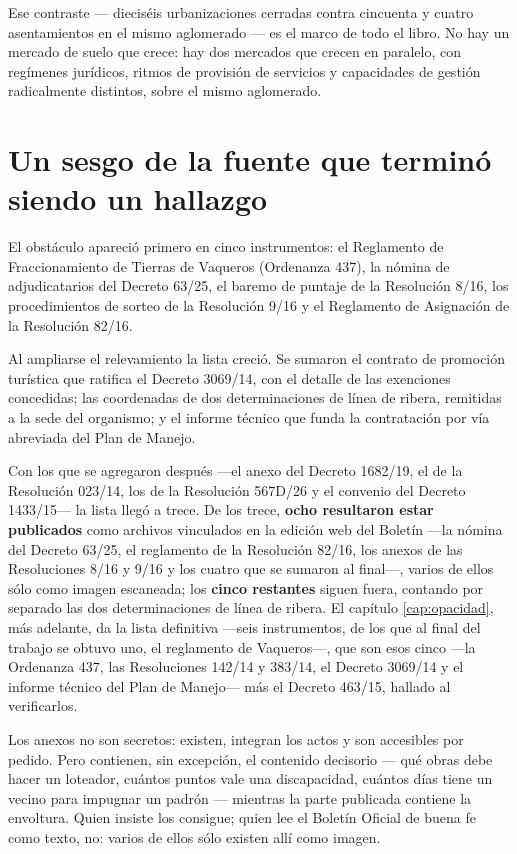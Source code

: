 \begin{cautela}
Ese contraste --- dieciséis urbanizaciones cerradas contra cincuenta y cuatro asentamientos en el mismo aglomerado --- es el marco de todo el libro. No hay un mercado de suelo que crece: hay dos mercados que crecen en paralelo, con regímenes jurídicos, ritmos de provisión de servicios y capacidades de gestión radicalmente distintos, sobre el mismo aglomerado.
\end{cautela}

\section{Un sesgo de la fuente que terminó siendo un hallazgo}

El obstáculo apareció primero en cinco instrumentos: el Reglamento de Fraccionamiento de Tierras de Vaqueros (Ordenanza 437), la nómina de adjudicatarios del Decreto 63/25, el baremo de puntaje de la Resolución 8/16, los procedimientos de sorteo de la Resolución 9/16 y el Reglamento de Asignación de la Resolución 82/16.

Al ampliarse el relevamiento la lista creció. Se sumaron el contrato de promoción turística que ratifica el Decreto 3069/14, con el detalle de las exenciones concedidas; las coordenadas de dos determinaciones de línea de ribera, remitidas a la sede del organismo; y el informe técnico que funda la contratación por vía abreviada del Plan de Manejo.

Con los que se agregaron después ---el anexo del Decreto 1682/19, el de la Resolución 023/14, los de la Resolución 567D/26 y el convenio del Decreto 1433/15--- la lista llegó a trece. De los trece, \textbf{ocho resultaron estar publicados} como archivos vinculados en la edición web del Boletín ---la nómina del Decreto 63/25, el reglamento de la Resolución 82/16, los anexos de las Resoluciones 8/16 y 9/16 y los cuatro que se sumaron al final---, varios de ellos sólo como imagen escaneada; los \textbf{cinco restantes} siguen fuera, contando por separado las dos determinaciones de línea de ribera. El capítulo \ref{cap:opacidad}, más adelante, da la lista definitiva ---seis instrumentos, de los que al final del trabajo se obtuvo uno, el reglamento de Vaqueros---, que son esos cinco ---la Ordenanza 437, las Resoluciones 142/14 y 383/14, el Decreto 3069/14 y el informe técnico del Plan de Manejo--- más el Decreto 463/15, hallado al verificarlos.

Los anexos no son secretos: existen, integran los actos y son accesibles por pedido. Pero contienen, sin excepción, el contenido decisorio --- qué obras debe hacer un loteador, cuántos puntos vale una discapacidad, cuántos días tiene un vecino para impugnar un padrón --- mientras la parte publicada contiene la envoltura. Quien insiste los consigue; quien lee el Boletín Oficial de buena fe como texto, no: varios de ellos sólo existen allí como imagen.

